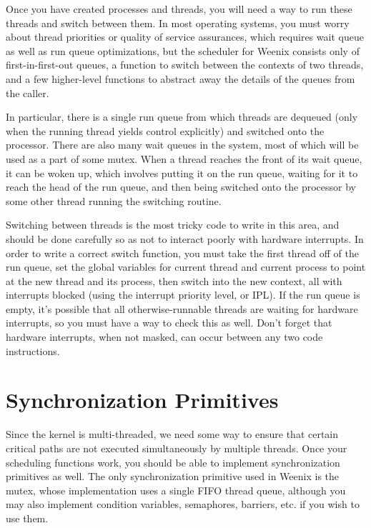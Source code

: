 Once you have created processes and threads, you will need a way to run these threads and switch between them. In most operating systems, you must worry about thread priorities or quality of service assurances, which requires wait queue as well as run queue optimizations, but the scheduler for Weenix consists only of first-in-first-out queues, a function to switch between the contexts of two threads, and a few higher-level functions to abstract away the details of the queues from the caller.

In particular, there is a single run queue from which threads are dequeued (only when the running thread yields control explicitly) and switched onto the processor. There are also many wait queues in the system, most of which will be used as a part of some mutex. When a thread reaches the front of its wait queue, it can be woken up, which involves putting it on the run queue, waiting for it to reach the head of the run queue, and then being switched onto the processor by some other thread running the switching routine.

Switching between threads is the most tricky code to write in this area, and should be done carefully so as not to interact poorly with hardware interrupts. In order to write a correct switch function, you must take the first thread off of the run queue, set the global variables for current thread and current process to point at the new thread and its process, then switch into the new context, all with interrupts blocked (using the interrupt priority level, or IPL). If the run queue is empty, it's possible that all otherwise-runnable threads are waiting for hardware interrupts, so you must have a way to check this as well. Don't forget that hardware interrupts, when not masked, can occur between any two code instructions.


\section{Synchronization Primitives}

Since the kernel is multi-threaded, we need some way to ensure that certain critical paths are not executed simultaneously by multiple threads. Once your scheduling functions work, you should be able to implement synchronization primitives as well. The only synchronization primitive used in Weenix is the mutex, whose implementation uses a single FIFO thread queue, although you may also implement condition variables, semaphores, barriers, etc. if you wish to use them.

